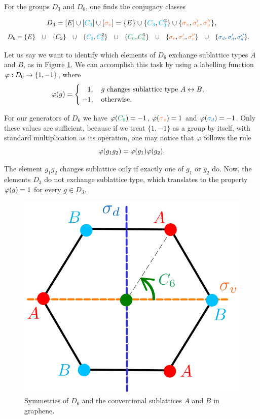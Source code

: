 \begin{example} \label{ex:conjclass_example_D3D6}
For the groups $D_3$ and $D_6$, one finds the conjugacy classes

\begin{equation} \label{eq:D3_classes}
D_3 = [E] \cup [\Ct] \cup [\sv] = \{E\} \cup \{\Ct, \Ctn{2}\} \cup \{\sv, \svp, \svpp\},
\end{equation}
\begin{align} \label{eq:D6_classes}
D_6 &= \{E\} &&\cup&& \{C_2\} &&\cup&& \{\Ct, \Ctn{2}\} &&\cup&& \{\Cs, \Csn{5}\} &&\cup&& \{\sv, \svp, \svpp\} &&\cup&& \{\sd, \sdp, \sdpp\}.
\end{align}
\end{example}

\begin{example} \label{ex:homomorphism_sublattice_AB_example}
Let us say we want to identify which elements of $D_6$ exchange sublattice types $A$ and $B$, as in Figure \ref{fig:hexagon_AB}. We can accomplish this task by using a labelling function $\varphi: D_6 \to \{1, -1\}$, where
\begin{align} \label{eq:homomorphism_example_sublattices_AB_D6}
\vphi(g) =
\begin{cases}
\; \P1, \quad g \text{ changes sublattice type } A \leftrightarrow B, \\
\; -1, \quad \text{otherwise.}
\end{cases}
\end{align}

For our generators of $D_6$ we have $\vphi(\Cs) = -1$, $\vphi(\sv) = 1$ and $\vphi(\sd) = -1$. Only these values are sufficient, because if we treat $\{1, -1\}$ as a group by itself, with standard multiplication as its operation, one may notice that $\varphi$ follows the rule
\begin{equation} \label{eq:vphi_g1g2_homomophism}
\varphi(g_1 g_2) = \varphi(g_1) \varphi(g_2).
\end{equation}

The element $g_1 g_2$ changes sublattice only if exactly one of $g_1$ or $g_2$ do. Now, the elements $D_3$ do not exchange sublattice type, which translates to the property $\varphi(g) = 1$ for every $g \in D_3$.
\end{example}

\begin{figure}[H]
\centering
\includegraphics[width=0.4\linewidth]{fig/hexagon_AB.png}
\caption{Symmetries of \(D_6\) and the conventional sublattices \(A\) and \(B\) in graphene.}
\label{fig:hexagon_AB}
\end{figure}



